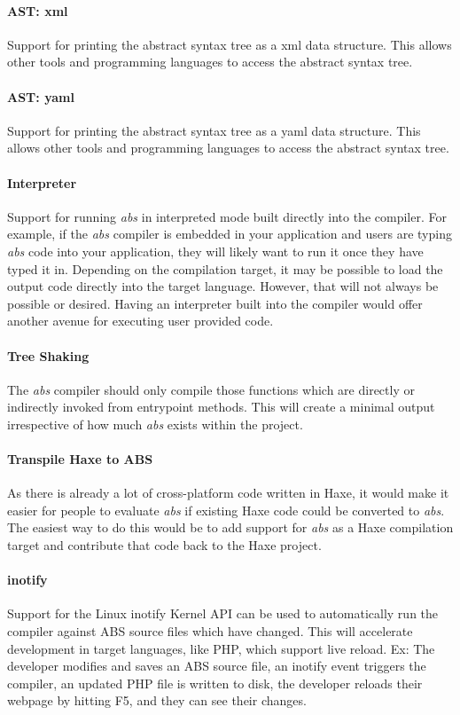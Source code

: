 \documentclass[hidelinks]{article}
\begin{document}
\paragraph{AST: xml} Support for printing the abstract syntax tree as a xml data structure. This allows other tools and programming languages to access the abstract syntax tree.
\paragraph{AST: yaml} Support for printing the abstract syntax tree as a yaml data structure. This allows other tools and programming languages to access the abstract syntax tree.
\paragraph{Interpreter} Support for running \textit{abs} in interpreted mode built directly into the compiler. For example, if the \textit{abs} compiler is embedded in your application and users are typing \textit{abs} code into your application, they will likely want to run it once they have typed it in. Depending on the compilation target, it may be possible to load the output code directly into the target language. However, that will not always be possible or desired. Having an interpreter built into the compiler would offer another avenue for executing user provided code.
\paragraph{Tree Shaking} The \textit{abs} compiler should only compile those functions which are directly or indirectly invoked from entrypoint methods. This will create a minimal output irrespective of how much \textit{abs} exists within the project.
\paragraph{Transpile Haxe to ABS} As there is already a lot of cross-platform code written in Haxe, it would make it easier for people to evaluate \textit{abs} if existing Haxe code could be converted to \textit{abs}. The easiest way to do this would be to add support for \textit{abs} as a Haxe compilation target and contribute that code back to the Haxe project.
\paragraph{inotify} Support for the Linux inotify Kernel API can be used to automatically run the compiler against ABS source files which have changed. This will accelerate development in target languages, like PHP, which support live reload. Ex: The developer modifies and saves an ABS source file, an inotify event triggers the compiler, an updated PHP file is written to disk, the developer reloads their webpage by hitting F5, and they can see their changes.
\end{document}
